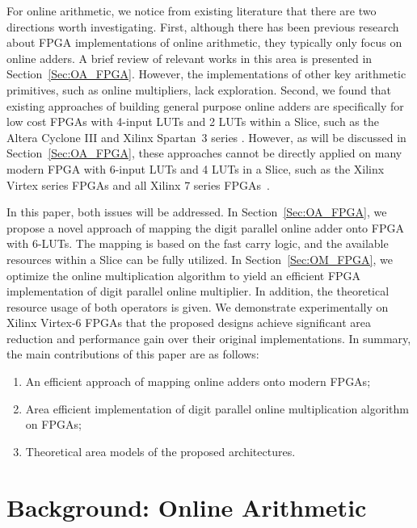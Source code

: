 \documentclass[conference]{IEEEtran}
\begin{document}
For online arithmetic, we notice from existing literature that there are two directions worth investigating. First, although there has been previous research about FPGA implementations of online arithmetic, they typically only focus on online adders. A brief review of relevant works in this area is presented in Section~\ref{Sec:OA_FPGA}. However, the implementations of other key arithmetic primitives, such as online multipliers, lack exploration. Second, we found that existing approaches of building general purpose online adders are specifically for low cost FPGAs with 4-input LUTs and 2 LUTs within a Slice, such as the Altera Cyclone III \cite{AlteraCyclone} and Xilinx Spartan~3 series \cite{XilinxSpartan}. However, as will be discussed in Section~\ref{Sec:OA_FPGA}, these approaches cannot be directly applied on many modern FPGA with 6-input LUTs and 4 LUTs in a Slice, such as the Xilinx Virtex series FPGAs and all Xilinx 7 series FPGAs~\cite{Virtex7}.

In this paper, both issues will be addressed. In Section~\ref{Sec:OA_FPGA}, we propose a novel approach of mapping the digit parallel online adder onto FPGA with 6-LUTs. The mapping is based on the fast carry logic, and the available resources within a Slice can be fully utilized. In Section~\ref{Sec:OM_FPGA}, we optimize the online multiplication algorithm to yield an efficient FPGA implementation of digit parallel online multiplier. In addition, the theoretical resource usage of both operators is given. We demonstrate experimentally on Xilinx Virtex-6 FPGAs that the proposed designs achieve significant area reduction and performance gain over their original implementations. In summary, the main contributions of this paper are as follows:
\begin{enumerate}
    \item An efficient approach of mapping online adders onto modern FPGAs;
    \item Area efficient implementation of digit parallel online multiplication algorithm on FPGAs;
    \item Theoretical area models of the proposed architectures.
\end{enumerate}



\section{Background: Online Arithmetic}\label{Sec:Background}
\end{document}
